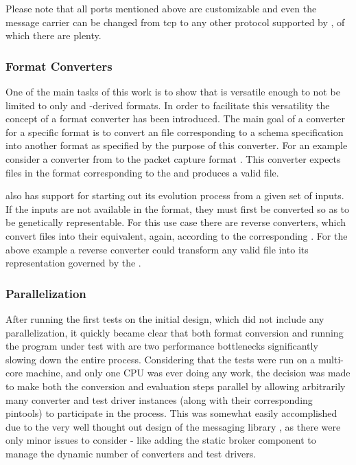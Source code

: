 Please note that all ports mentioned above are customizable and even the message carrier can be changed from tcp 
to any other protocol supported by \zmq, of which there are plenty.

\subsubsection{Format Converters}
One of the main tasks of this work is to show that \xmlmate is versatile enough to not be limited to 
only \xml and \xml-derived formats. In order to facilitate this versatility the concept of a format 
converter has been introduced. The main goal of a converter for a specific format is to convert an 
\xml file corresponding to a schema specification into another format as specified by the purpose 
of this converter. For an example consider a converter from \xml to the packet capture format \pcap. 
This converter expects \xml files in the format corresponding to the \pcap{} \xsd and produces a 
valid \pcap file. 


\xmlmate also has support for starting out its evolution process from a given set of inputs. If the   
inputs are not available in the \xml format, they must first be converted so as to be genetically 
representable. For this use case there are reverse converters, which convert files into their 
\xml equivalent, again, according to the corresponding \xsd. For the above example a reverse converter 
could transform any valid \pcap file into its \xml representation governed by the \pcap{} \xsd.
\subsubsection{Parallelization}
After running the first tests on the initial \xmlmate design, which did not include any parallelization, 
it quickly became clear that both format conversion and running the program under test with \pin 
are two performance bottlenecks significantly slowing down the entire process. Considering that the 
tests were run on a multi-core machine, and only one CPU was ever doing any work, the decision was 
made to make both the conversion and evaluation steps parallel by allowing arbitrarily many 
converter and test driver instances (along with their corresponding pintools) to participate in the process. 
This was somewhat easily accomplished due to the very well thought out design of the messaging library \zmq, 
as there were only minor issues to consider - like adding the static broker component to 
manage the dynamic number of converters and test drivers.

